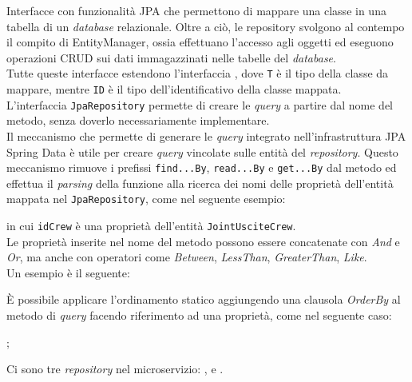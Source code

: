 \label{Repository}
\noindent Interfacce con funzionalità \gls{JPA} che permettono di mappare una
classe in
una tabella
di un \textit{database} relazionale. Oltre a ciò, le repository svolgono al
contempo il
compito di \gls{EntityManager}, ossia effettuano
l'accesso agli oggetti ed eseguono operazioni \gls{CRUD} sui dati immagazzinati
nelle tabelle del \textit{database}.\\
Tutte queste interfacce estendono l'interfaccia ,
dove \texttt{T} è il tipo della classe da mappare, mentre \texttt{ID} è il tipo
dell'identificativo della classe mappata.\\
L'interfaccia \texttt{JpaRepository} permette di creare le \textit{query} a
partire dal nome del metodo, senza doverlo necessariamente implementare.\\
Il meccanismo che permette di generare le \textit{query} integrato
nell'infrastruttura JPA Spring Data è utile per creare \textit{query} vincolate
sulle entità del \textit{repository}. Questo meccanismo rimuove i prefissi
\texttt{find...By}, \texttt{read...By} e \texttt{get...By} dal metodo ed
effettua il \textit{parsing} della funzione alla ricerca dei nomi delle
proprietà dell'entità mappata nel \texttt{JpaRepository}, come nel seguente
esempio:
\begin{center}
\end{center}
in cui \texttt{idCrew} è una proprietà dell'entità \texttt{JointUsciteCrew}.\\
Le proprietà inserite nel nome del metodo possono essere concatenate con
\textit{And} e \textit{Or}, ma anche con operatori come \textit{Between},
\textit{LessThan}, \textit{GreaterThan}, \textit{Like}. \\
Un esempio è il seguente:
\begin{center}
\end{center}
È possibile applicare l'ordinamento statico aggiungendo una clausola
\textit{OrderBy} al metodo di \textit{query} facendo riferimento ad una
proprietà, come nel seguente caso:
\begin{center}
    ;
\end{center}
Ci sono tre \textit{repository} nel \gls{microservizio}:
,  e
.
\label{JointUsciteCrewRepository}
